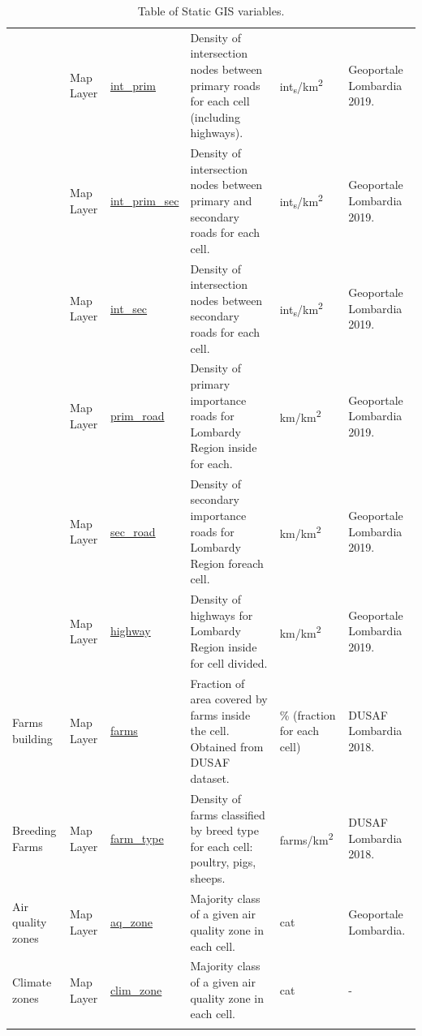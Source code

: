 \begin{center}
\begin{longtable}{ |p{2.1cm}|p{1.5cm}|p{2.3cm}|p{4cm}|p{1.5cm}|p{2cm}| }
\hline
\pagebreak
\hline
\multirow{6}{4em}{Road Infrastructures} & Map Layer  & \underline{int\_prim} & Density of intersection nodes between primary roads for each cell (including highways). & int\textsubscript{s}/km\textsuperscript{2} & Geoportale Lombardia 2019.\\ 
& Map Layer  & \underline{int\_prim\_sec} & Density of intersection nodes between primary and secondary roads for each cell. & int\textsubscript{s}/km\textsuperscript{2} & Geoportale Lombardia 2019.\\ 
& Map Layer  & \underline{int\_sec} & Density of intersection nodes between secondary roads for each cell. & int\textsubscript{s}/km\textsuperscript{2} & Geoportale Lombardia 2019.\\ 
& Map Layer  & \underline{prim\_road} & Density of primary importance roads for Lombardy Region inside for each. & km/km\textsuperscript{2} & Geoportale Lombardia 2019.\\ 
& Map Layer  & \underline{sec\_road} & Density of secondary importance roads for Lombardy Region foreach cell. & km/km\textsuperscript{2} & Geoportale Lombardia 2019.\\ 
& Map Layer  & \underline{highway} & Density of highways for Lombardy Region inside for cell divided. & km/km\textsuperscript{2} & Geoportale Lombardia 2019.\\ 
\hline

\multirow{1}{4em}{Farms building} & Map Layer  & \underline{farms} & Fraction of area covered by farms inside the cell. Obtained from DUSAF dataset. & \% (fraction for each cell) & DUSAF Lombardia 2018.\\ \hline
\multirow{1}{4em}{Breeding Farms} & Map Layer  & \underline{farm\_type} & Density of farms classified by breed type for each cell: poultry, pigs, sheeps. & farms/km\textsuperscript{2} & DUSAF Lombardia 2018.\\ \hline
\multirow{1}{4em}{Air quality zones} & Map Layer  & \underline{aq\_zone} & Majority class of a given air quality zone in each cell. & cat  & Geoportale Lombardia.\\ \hline
\multirow{1}{4em}{Climate zones} & Map Layer  & \underline{clim\_zone} & Majority class of a given air quality zone in each cell. & cat  & - \\ \hline


\hline
\caption{Table of Static GIS variables.}

\end{longtable}
\end{center}
\pagebreak

